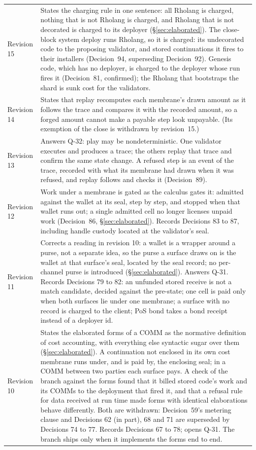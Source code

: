 \documentclass[11pt]{article}
\begin{document}
\begin{center}
\begin{tabular}{@{}lP{10.6cm}@{}}
Revision 15 & States the charging rule in one sentence: all Rholang is charged, nothing that is not Rholang is charged, and Rholang that is not decorated is charged to its deployer (\S\ref{sec:elaborated}). The close-block system deploy runs Rholang, so it is charged: its undecorated code to the proposing validator, and stored continuations it fires to their installers (Decision~94, superseding Decision~92). Genesis code, which has no deployer, is charged to the deployer whose run fires it (Decision~81, confirmed); the Rholang that bootstraps the shard is sunk cost for the validators. \\
Revision 14 & States that replay recomputes each membrane's drawn amount as it follows the trace and compares it with the recorded amount, so a forged amount cannot make a payable step look unpayable. (Its exemption of the close is withdrawn by revision~15.) \\
Revision 13 & Answers Q-32: play may be nondeterministic. One validator executes and produces a trace; the others replay that trace and confirm the same state change. A refused step is an event of the trace, recorded with what its membrane had drawn when it was refused, and replay follows and checks it (Decision~89). \\
Revision 12 & Work under a membrane is gated as the calculus gates it: admitted against the wallet at its seal, step by step, and stopped when that wallet runs out; a single admitted cell no longer licenses unpaid work (Decision~86, \S\ref{sec:elaborated}). Records Decisions 83 to 87, including handle custody located at the validator's seal. \\
Revision 11 & Corrects a reading in revision 10: a wallet is a wrapper around a purse, not a separate idea, so the purse a surface draws on is the wallet at that surface's seal, located by the seal record; no per-channel purse is introduced (\S\ref{sec:elaborated}). Answers Q-31. Records Decisions 79 to 82: an unfunded stored receive is not a match candidate, decided against the pre-state; one cell is paid only when both surfaces lie under one membrane; a surface with no record is charged to the client; PoS bond takes a bond receipt instead of a deployer id. \\
Revision 10 & States the elaborated forms of a COMM as the normative definition of cost accounting, with everything else syntactic sugar over them (\S\ref{sec:elaborated}). A continuation not enclosed in its own cost membrane runs under, and is paid by, the enclosing seal; in a COMM between two parties each surface pays. A check of the branch against the forms found that it billed stored code's work and its COMMs to the deployment that fired it, and that a refusal rule for data received at run time made forms with identical elaborations behave differently. Both are withdrawn: Decision~59's metering clause and Decisions 62 (in part), 68 and 71 are superseded by Decisions 74 to 77. Records Decisions 67 to 78; opens Q-31. The branch ships only when it implements the forms end to end. \\

\end{tabular}
\end{center}
\end{document}
